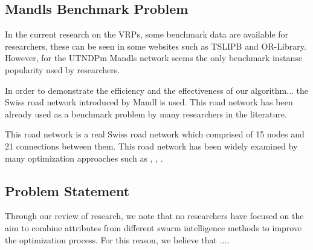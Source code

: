 

\subsection{Mandls Benchmark Problem}
In the current research on the VRPs, some benchmark data are available for researchers, these can be seen in some websites such as TSLIPB and OR-Library. However, for the UTNDPm Mandls network seems the only benchmark instanse popularity used by researchers. 

In order to demonstrate the efficiency and the effectiveness of our algorithm... the Swiss road network introduced by Mandl is used. This road network has been already used as a benchmark problem by many researchers in the literature. \citep{kechagiopoulos14}

This road network is a real Swiss road network which comprised of 15 nodes and 21 connections between them. This road network has been widely examined by many optimization approaches such as \citep{kechagiopoulos14}, \citep{fan09}, \citep{nikolic14}.


\subsection{Problem Statement}
Through our review of research, we note that no researchers have focused on the aim to combine attributes from different swarm intelligence methods to improve the optimization process. For this reason, we believe that .... 